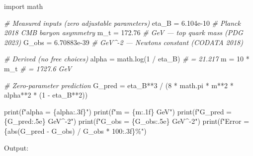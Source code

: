 \documentclass[
  11pt,
]{article}
\newenvironment{Shaded}{}{}
\newcommand{\BuiltInTok}[1]{#1}
\newcommand{\CommentTok}[1]{\textcolor[rgb]{0.38,0.63,0.69}{\textit{#1}}}
\newcommand{\DecValTok}[1]{\textcolor[rgb]{0.25,0.63,0.44}{#1}}
\newcommand{\FloatTok}[1]{\textcolor[rgb]{0.25,0.63,0.44}{#1}}
\newcommand{\ImportTok}[1]{#1}
\newcommand{\NormalTok}[1]{#1}
\newcommand{\OperatorTok}[1]{\textcolor[rgb]{0.40,0.40,0.40}{#1}}
\newcommand{\SpecialCharTok}[1]{\textcolor[rgb]{0.25,0.44,0.63}{#1}}
\newcommand{\SpecialStringTok}[1]{\textcolor[rgb]{0.73,0.40,0.53}{#1}}
\begin{document}
\begin{Shaded}
\begin{Highlighting}[]
\ImportTok{import}\NormalTok{ math}

\CommentTok{\# Measured inputs (zero adjustable parameters)}
\NormalTok{eta\_B }\OperatorTok{=} \FloatTok{6.104e{-}10}     \CommentTok{\# Planck 2018 CMB baryon asymmetry}
\NormalTok{m\_t   }\OperatorTok{=} \FloatTok{172.76}        \CommentTok{\# GeV — top quark mass (PDG 2023)}
\NormalTok{G\_obs }\OperatorTok{=} \FloatTok{6.70883e{-}39}   \CommentTok{\# GeV\^{}{-}2 — Newton\textquotesingle{}s constant (CODATA 2018)}

\CommentTok{\# Derived (no free choices)}
\NormalTok{alpha }\OperatorTok{=}\NormalTok{ math.log(}\DecValTok{1} \OperatorTok{/}\NormalTok{ eta\_B)          }\CommentTok{\# = 21.217}
\NormalTok{m     }\OperatorTok{=} \DecValTok{10} \OperatorTok{*}\NormalTok{ m\_t                      }\CommentTok{\# = 1727.6 GeV}

\CommentTok{\# Zero{-}parameter prediction}
\NormalTok{G\_pred }\OperatorTok{=}\NormalTok{ eta\_B}\OperatorTok{**}\DecValTok{3} \OperatorTok{/}\NormalTok{ (}\DecValTok{8} \OperatorTok{*}\NormalTok{ math.pi }\OperatorTok{*}\NormalTok{ m}\OperatorTok{**}\DecValTok{2} \OperatorTok{*}\NormalTok{ alpha}\OperatorTok{**}\DecValTok{2} \OperatorTok{*}\NormalTok{ (}\DecValTok{1} \OperatorTok{{-}}\NormalTok{ eta\_B}\OperatorTok{**}\DecValTok{2}\NormalTok{))}

\BuiltInTok{print}\NormalTok{(}\SpecialStringTok{f"alpha  = }\SpecialCharTok{\{}\NormalTok{alpha}\SpecialCharTok{:.3f\}}\SpecialStringTok{"}\NormalTok{)}
\BuiltInTok{print}\NormalTok{(}\SpecialStringTok{f"m      = }\SpecialCharTok{\{m:.1f\}}\SpecialStringTok{ GeV"}\NormalTok{)}
\BuiltInTok{print}\NormalTok{(}\SpecialStringTok{f"G\_pred = }\SpecialCharTok{\{}\NormalTok{G\_pred}\SpecialCharTok{:.5e\}}\SpecialStringTok{ GeV\^{}{-}2"}\NormalTok{)}
\BuiltInTok{print}\NormalTok{(}\SpecialStringTok{f"G\_obs  = }\SpecialCharTok{\{}\NormalTok{G\_obs}\SpecialCharTok{:.5e\}}\SpecialStringTok{ GeV\^{}{-}2"}\NormalTok{)}
\BuiltInTok{print}\NormalTok{(}\SpecialStringTok{f"Error  = }\SpecialCharTok{\{}\BuiltInTok{abs}\NormalTok{(G\_pred }\OperatorTok{{-}}\NormalTok{ G\_obs) }\OperatorTok{/}\NormalTok{ G\_obs }\OperatorTok{*} \DecValTok{100}\SpecialCharTok{:.3f\}}\SpecialStringTok{\%"}\NormalTok{)}
\end{Highlighting}
\end{Shaded}

Output:
\end{document}
